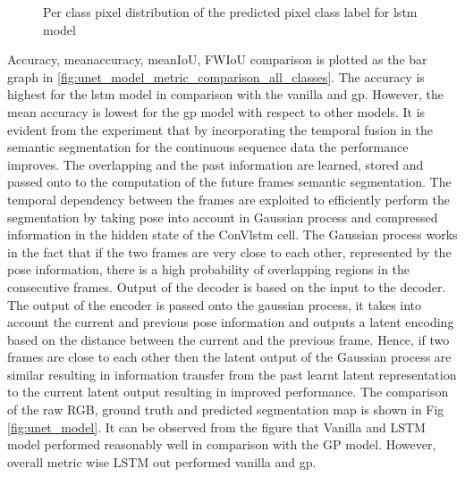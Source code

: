 	\begin{figure}%
		\centering
		\qquad
		\caption{Per class pixel distribution of the predicted pixel class label for lstm model}%
		\label{fig:y_gt_and_predic_lstm}%
	\end{figure}

	Accuracy, meanaccuracy, meanIoU, FWIoU comparison is plotted as the bar graph in \ref{fig:unet_model_metric_comparison_all_classes}. The accuracy is highest for the lstm model in comparison with the vanilla and gp. However, the mean accuracy is lowest for the gp model with respect to other models. It is evident from the experiment that by incorporating the temporal fusion in the semantic segmentation for the continuous sequence data the performance improves. The overlapping and the past information are learned, stored and passed onto to the computation of the future frames semantic segmentation. The temporal dependency between the frames are exploited to efficiently perform the segmentation by taking pose into account in Gaussian process and compressed information in the hidden state of the ConVlstm cell. The Gaussian process works in the fact that if the two frames are very close to each other, represented by the pose information, there is a high probability of overlapping regions in the consecutive frames. Output of the decoder is based on the input to the decoder. The output of the encoder is passed onto the gaussian process, it takes into account the current and previous pose information and outputs a latent encoding based on the distance between the current and the previous frame. Hence, if two frames are close to each other then the latent output of the Gaussian process are similar resulting in information transfer from the past learnt latent representation to the current latent output resulting in improved performance. The comparison of the raw RGB, ground truth and predicted segmentation map is shown in Fig \ref{fig:unet_model}. It can be observed from the figure that Vanilla and LSTM model performed reasonably well in comparison with the GP model. However, overall metric wise LSTM out performed vanilla and gp.   
	

